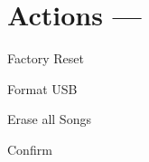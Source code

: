 \section[Actions]{Actions --- \UiKey{\DO}}

Factory Reset


Format USB

Erase all Songs














































Confirm
